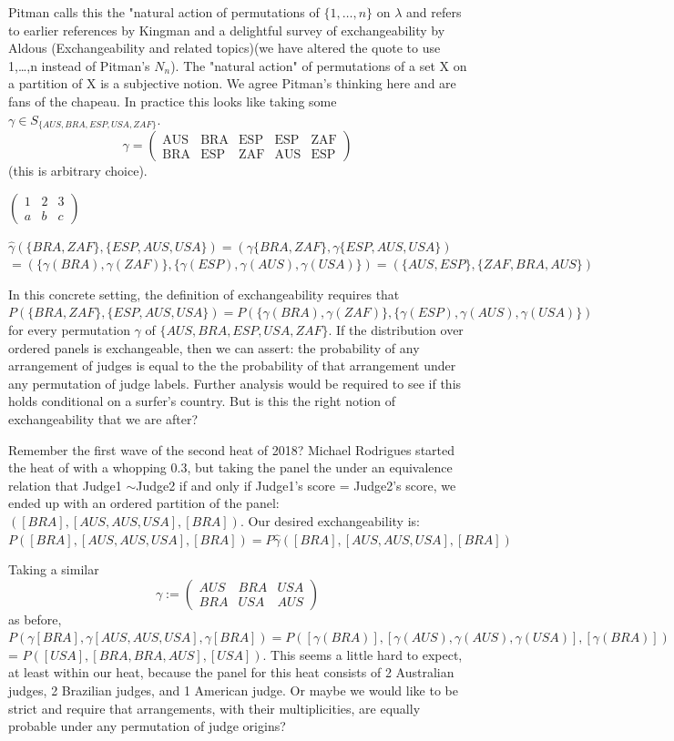 \documentclass{article}
\theoremstyle{definition}
\begin{document}
Pitman calls this the "natural action of permutations of $\{1,…,n\}$  on $\lambda$ and refers to earlier references by Kingman and a delightful survey of exchangeability by Aldous (Exchangeability and related topics)(we have altered the quote to use {1,…,n} instead of Pitman's $N_n$). The "natural action" of permutations of a set X on a partition of X is a subjective notion. We agree Pitman's thinking here and are fans of the chapeau. 
In practice this looks like taking some $\gamma \in S_{\{AUS,BRA,ESP,USA,ZAF\}}$. 
\[\gamma=
\begin{pmatrix} 
\text{AUS} & \text{BRA} & \text{ESP} & \text{ESP} & \text{ZAF}\\
\text{BRA}  & \text{ESP} & \text{ZAF} & \text{AUS} & \text{ESP}
\end{pmatrix}
\] (this is arbitrary choice). 

\(
\begin{pmatrix}
1 & 2 & 3\\
a & b & c
\end{pmatrix}
\)

$ \hat{\gamma}(\{BRA, ZAF\},\{ESP, AUS, USA\}) =(\gamma\{BRA, ZAF\},\gamma\{ESP, AUS, USA\}) $
$ =(\{\gamma(BRA),\gamma(ZAF)\},\{\gamma(ESP),\gamma(AUS),\gamma(USA)\}) = (\{AUS, ESP\},\{ZAF, BRA, AUS\}) $

In this concrete setting, the definition of exchangeability requires that $P(\{BRA,ZAF\},\{ESP,AUS,USA\}) = P(\{\gamma(BRA),\gamma(ZAF)\},\{\gamma(ESP),\gamma(AUS),\gamma(USA)\})$ for every permutation $\gamma$ of $\{AUS,BRA,ESP,USA,ZAF\}$. If the distribution over ordered panels is exchangeable, then we can assert: the probability of any arrangement of judges is equal to the the probability of that arrangement under any permutation of judge labels. Further analysis would be required to see if this holds conditional on a surfer's country. But is this the right notion of exchangeability that we are after?

Remember the first wave of the second heat of 2018? Michael Rodrigues started the heat of with a whopping 0.3, but taking the panel the under an equivalence relation that Judge1 $\sim$Judge2 if and only if Judge1's score = Judge2's score, we ended up with an ordered partition of the panel: $([BRA],[AUS,AUS,USA],[BRA])$. Our desired exchangeability is: $P([BRA],[AUS,AUS,USA],[BRA]) = P\hat{\gamma}([BRA],[AUS,AUS,USA],[BRA])$

Taking a similar $$\gamma:=\begin{pmatrix} AUS & BRA & USA \\ BRA & USA & AUS \end{pmatrix}$$ as before, $P(\gamma[BRA],\gamma[AUS,AUS,USA],\gamma[BRA])= P([\gamma(BRA)],[\gamma(AUS),\gamma(AUS),\gamma(USA)],[\gamma(BRA)])$ = $P([USA],[BRA,BRA,AUS],[USA])$. This seems a little hard to expect, at least within our heat, because the panel for this heat consists of 2 Australian judges, 2 Brazilian judges, and 1 American judge. Or maybe we would like to be strict and require that arrangements, with their multiplicities, are equally probable under any permutation of judge origins?
\end{document}

